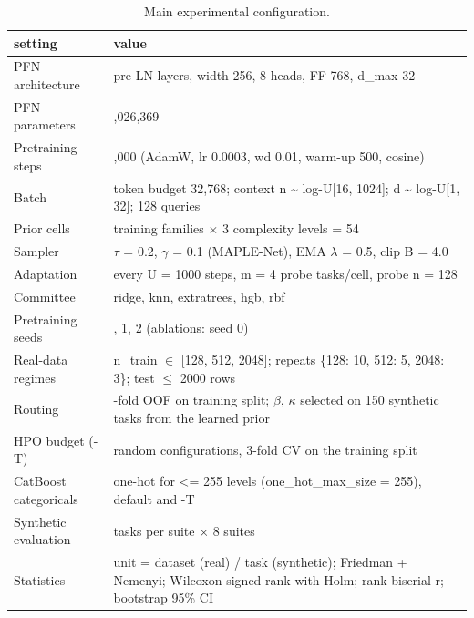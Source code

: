 \begin{table}[!htb]
\caption{Main experimental configuration.}
\label{tab:table02_configuration}
\centering
\fontsize{9}{11}\selectfont
\setlength{\tabcolsep}{2pt}
\begin{tabularx}{\textwidth}{l>{\raggedright\arraybackslash}X}
\toprule
setting & value \\
\midrule
PFN architecture & 6 pre-LN layers, width 256, 8 heads, FF 768, d\_max 32 \\
PFN parameters & 4,026,369 \\
Pretraining steps & 15,000 (AdamW, lr 0.0003, wd 0.01, warm-up 500, cosine) \\
Batch & token budget 32,768; context n \textasciitilde{} log-U[16, 1024]; d \textasciitilde{} log-U[1, 32]; 128 queries \\
Prior cells & 18 training families $\times$ 3 complexity levels = 54 \\
Sampler & $\tau$ = 0.2, $\gamma$ = 0.1 (MAPLE-Net), EMA $\lambda$ = 0.5, clip B = 4.0 \\
Adaptation & every U = 1000 steps, m = 4 probe tasks/cell, probe n = 128 \\
Committee & ridge, knn, extratrees, hgb, rbf \\
Pretraining seeds & 0, 1, 2 (ablations: seed 0) \\
Real-data regimes & n\_train $\in$ [128, 512, 2048]; repeats \{128: 10, 512: 5, 2048: 3\}; test $\le$ 2000 rows \\
Routing & 5-fold OOF on training split; $\beta$, $\kappa$ selected on 150 synthetic tasks from the learned prior \\
HPO budget (-T) & 10 random configurations, 3-fold CV on the training split \\
CatBoost categoricals & one-hot for <= 255 levels (one\_hot\_max\_size = 255), default and -T \\
Synthetic evaluation & 200 tasks per suite $\times$ 8 suites \\
Statistics & unit = dataset (real) / task (synthetic); Friedman + Nemenyi; Wilcoxon signed-rank with Holm; rank-biserial r; bootstrap 95\% CI \\
\bottomrule
\end{tabularx}
\end{table}
